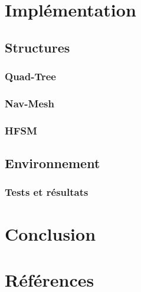 \documentclass[hidelinks,a4paper, 12pt]{article}
\begin{document}
    \section{Implémentation}
    \subsection{Structures}
    \subsubsection{Quad-Tree}
    \subsubsection{Nav-Mesh}
    \subsubsection{HFSM}
    \subsection{Environnement}
    \subsubsection{Tests et résultats}
    
    \section{Conclusion}
    
    \section{Références}


    \newpage
    \begin{appendices}
    \end{appendices}
    
    
\end{document}
